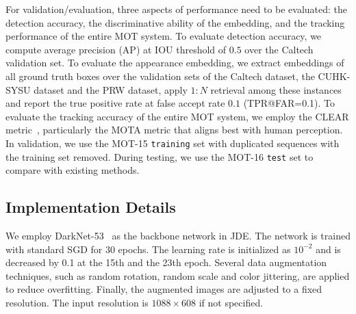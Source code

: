 \documentclass[runningheads]{llncs}
\begin{document}
For validation/evaluation, three aspects of performance need to be evaluated: the detection accuracy, the discriminative ability of the embedding, and the tracking performance of the entire MOT system. To evaluate detection accuracy, we compute average precision (AP) at IOU threshold of $0.5$ over the Caltech validation set. To evaluate the appearance embedding, we extract embeddings of all ground truth boxes over the validation sets of the Caltech dataset, the CUHK-SYSU dataset and the PRW dataset, apply $1:N$ retrieval among these instances and report the true positive rate at false accept rate $0.1$ (TPR@FAR=0.1). To evaluate the tracking accuracy of the entire MOT system, we employ the CLEAR metric~\cite{CLEAR}, particularly the MOTA metric that aligns best with human perception. In validation, we use the MOT-15 \texttt{training} set with duplicated sequences with the training set removed. During testing, we use the MOT-16 \texttt{test} set to compare with existing methods.





\subsection{Implementation Details}
We employ DarkNet-53~\cite{yolov3} as the backbone network in JDE. The network is trained with standard SGD for 30 epochs. The learning rate is initialized as $10^{-2}$ and is decreased by 0.1 at the 15th and the 23th epoch. Several data augmentation techniques, such as random rotation, random scale and color jittering, are applied to reduce overfitting. Finally, the augmented images are adjusted to a fixed resolution. The input resolution is $1088\times608$ if not specified.
\end{document}
